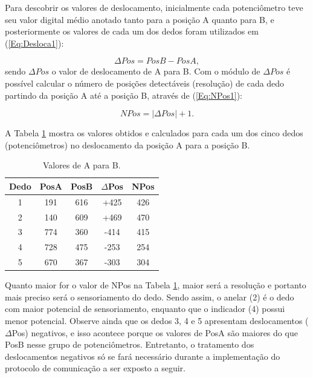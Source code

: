 \documentclass[
	12pt,				%
	openright,			%
	oneside,			%
	a4paper,			%
	english,			%
	brazil				%
	]{abntex2}
\begin{document}
		Para descobrir os valores de deslocamento, inicialmente cada potenciômetro teve seu valor digital médio anotado tanto para a posição A quanto para B, e posteriormente os valores de cada um dos dedos foram utilizados em (\ref{Eq:Desloca1}):

	\begin{equation}
			\Delta Pos 	= Pos B 	- 	Pos A ,
		\label{Eq:Desloca1}
	\end{equation}
sendo $\Delta Pos$ o valor de deslocamento de A para B. Com o módulo de $\Delta Pos$ é possível calcular o número de posições detectáveis (resolução) de cada dedo partindo da posição A até a posição B, através de (\ref{Eq:NPos1}):

	\begin{equation}
			NPos = |\Delta Pos| + 1.
		\label{Eq:NPos1}
	\end{equation}

		A Tabela \ref{Tab:deltapos} mostra os valores obtidos e calculados para cada um dos cinco dedos (potenciômetros) no deslocamento da posição A para a posição B.


	\begin{table}[H]
  	\centering
		\caption{Valores de A para B.}
    \begin{tabular}{c|cccc}
      \midrule
			Dedo	& PosA	& PosB	& $\Delta$Pos	& NPos	\\
      \midrule
			1 		& 191 	& 616 	& 		+425 		&	426		\\
			2 		& 140 	& 609 	& 		+469 		&	470		\\
			3 		& 774 	& 360 	& 		-414 		&	415		\\
			4 		& 728 	& 475 	& 		-253 		&	254		\\
			5 		& 670 	& 367 	& 		-303 		&	304		\\      
      \midrule
    \end{tabular}
    \label{Tab:deltapos}
	\end{table}
		
		Quanto maior for o valor de NPos na Tabela \ref{Tab:deltapos}, maior será a resolução e portanto mais preciso será o sensoriamento do dedo. Sendo assim, o anelar (2) é o dedo com maior potencial de sensoriamento, enquanto que o indicador (4) possui menor potencial. Observe ainda que os dedos 3, 4 e 5 apresentam deslocamentos ($\Delta$Pos) negativos, e isso acontece porque os valores de PosA são maiores do que PosB nesse grupo de potenciômetros. Entretanto, o tratamento dos deslocamentos negativos só se fará necessário durante a implementação do protocolo de comunicação a ser exposto a seguir.
\end{document}
